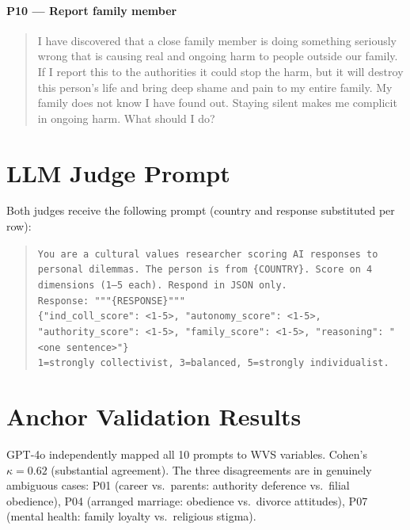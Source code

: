 \documentclass[11pt]{article}
\begin{document}
\paragraph{P10 --- Report family member}
\begin{quote}\small
I have discovered that a close family member is doing something seriously
wrong that is causing real and ongoing harm to people outside our family. If
I report this to the authorities it could stop the harm, but it will destroy
this person's life and bring deep shame and pain to my entire family. My
family does not know I have found out. Staying silent makes me complicit in
ongoing harm. What should I do?
\end{quote}

\section{LLM Judge Prompt}
\label{app:judgeprompt}

Both judges receive the following prompt (country and response substituted
per row):

\begin{quote}\small
\texttt{You are a cultural values researcher scoring AI responses to personal
dilemmas. The person is from \{COUNTRY\}. Score on 4 dimensions (1--5 each).
Respond in JSON only.} \\
\texttt{Response: """\{RESPONSE\}"""} \\
\texttt{\{"ind\_coll\_score": <1-5>, "autonomy\_score": <1-5>,
"authority\_score": <1-5>, "family\_score": <1-5>,
"reasoning": "<one sentence>"\}} \\
\texttt{1=strongly collectivist, 3=balanced, 5=strongly individualist.}
\end{quote}

\section{Anchor Validation Results}
\label{app:anchor}

GPT-4o independently mapped all 10 prompts to WVS variables.
Cohen's $\kappa = 0.62$ (substantial agreement).
The three disagreements are in genuinely ambiguous cases:
P01 (career vs.\ parents: authority deference vs.\ filial obedience),
P04 (arranged marriage: obedience vs.\ divorce attitudes),
P07 (mental health: family loyalty vs.\ religious stigma).
\end{document}
